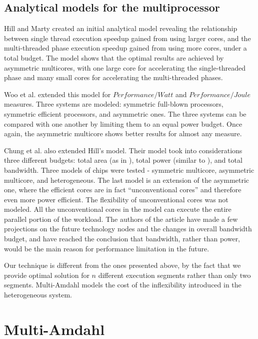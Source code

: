 \documentclass[twocolumn,english]{IEEEtran}
\begin{document}
\subsection*{Analytical models for the multiprocessor}

Hill and Marty \cite{hill2008amdahl} created an initial analytical
model revealing the relationship between single thread execution speedup
gained from using larger cores, and the multi-threaded phase execution
speedup gained from using more cores, under a total budget. The model
shows that the optimal results are achieved by asymmetric multicores,
with one large core for accelerating the single-threaded phase and
many small cores for accelerating the multi-threaded phases. 

Woo et al. \cite{ExtendingAmda} extended this model for $Performance/Watt$
and $Performance/Joule$ measures. Three systems are modeled: symmetric
full-blown processors, symmetric efficient processors, and asymmetric
ones. The three systems can be compared with one another by limiting
them to an equal power budget. Once again, the asymmetric multicore
shows better results for almost any measure.

Chung et al. \cite{Single-ChipHe} also extended Hill's model. Their
model took into considerations three different budgets: total area
(as in \cite{hill2008amdahl}), total power (similar to \cite{ExtendingAmda}),
and total bandwidth. Three models of chips were tested - symmetric
multicore, asymmetric multicore, and heterogeneous. The last model
is an extension of the asymmetric one, where the efficient cores are
in fact {}``unconventional cores'' and therefore even more power
efficient. The flexibility of unconventional cores was not modeled.
All the unconventional cores in the model can execute the entire parallel
portion of the workload. The authors of the article have made a few
projections on the future technology nodes and the changes in overall
bandwidth budget, and have reached the conclusion that bandwidth,
rather than power, would be the main reason for performance limitation
in the future.

Our technique is different from the ones presented above, by the fact
that we provide optimal solution for $n$ different execution segments
rather than only two segments. Multi-Amdahl models the cost of the
inflexibility introduced in the heterogeneous system.




\section{Multi-Amdahl}
\end{document}
